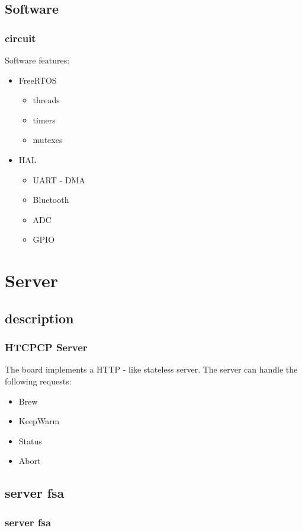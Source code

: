 \documentclass[12pt]{beamer}
\begin{document}
\subsection{Software}
\begin{frame}
    \frametitle{circuit}
Software features:
\begin{itemize}
    \item FreeRTOS
        \begin{itemize}
            \item threads
            \item timers
            \item mutexes
        \end{itemize}
    \item  HAL
        \begin{itemize}
            \item UART - DMA
            \item Bluetooth
            \item ADC
            \item GPIO
        \end{itemize}
\end{itemize}
\end{frame}

\section{Server}
\subsection{description}
\begin{frame}
    \frametitle{HTCPCP Server}
    The board implements a HTTP - like stateless server.
    The server can handle the following requests:
    \begin{itemize}
        \item Brew
        \item KeepWarm
        \item Status
        \item Abort
    \end{itemize}

\end{frame}
\subsection{server fsa}
\begin{frame}
    \frametitle{server fsa}
    
\end{frame}
\end{document}
